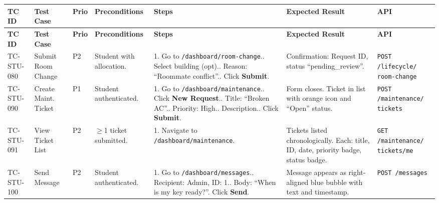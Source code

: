\documentclass[12pt,a4paper]{article}
\begin{document}
\begin{longtable}{L{2cm} L{3cm} L{1cm} L{4cm} L{5.5cm} L{5.5cm} L{3cm}}
\toprule
\textbf{TC ID} & \textbf{Test Case} & \textbf{Prio} & \textbf{Preconditions} & \textbf{Steps} & \textbf{Expected Result} & \textbf{API} \\
\midrule
\endfirsthead
\toprule
\textbf{TC ID} & \textbf{Test Case} & \textbf{Prio} & \textbf{Preconditions} & \textbf{Steps} & \textbf{Expected Result} & \textbf{API} \\
\midrule
\endhead
\bottomrule
\endfoot

TC-STU-080
& Submit Room Change
& P2
& Student with allocation.
& 1. Go to \texttt{/dashboard/room-change}.. Select building (opt).. Reason: ``Roommate conflict''.. Click \textbf{Submit}.
& Confirmation: Request ID, status ``pending\_review''.
& \texttt{POST /lifecycle/ room-change}
\\
\midrule

TC-STU-090
& Create Maint. Ticket
& P1
& Student authenticated.
& 1. Go to \texttt{/dashboard/maintenance}.. Click \textbf{New Request}.. Title: ``Broken AC''.. Priority: High.. Description.. Click \textbf{Submit}.
& Form closes. Ticket in list with orange icon and ``Open'' status.
& \texttt{POST /maintenance/ tickets}
\\
\midrule

TC-STU-091
& View Ticket List
& P2
& $\geq$1 ticket submitted.
& 1. Navigate to \texttt{/dashboard/maintenance}.
& Tickets listed chronologically. Each: title, ID, date, priority badge, status badge.
& \texttt{GET /maintenance/ tickets/me}
\\
\midrule

TC-STU-100
& Send Message
& P2
& Student authenticated.
& 1. Go to \texttt{/dashboard/messages}.. Recipient: Admin, ID: 1.. Body: ``When is my key ready?''. Click \textbf{Send}.
& Message appears as right-aligned blue bubble with text and timestamp.
& \texttt{POST /messages}
\\
\midrule


\end{longtable}
\end{document}
